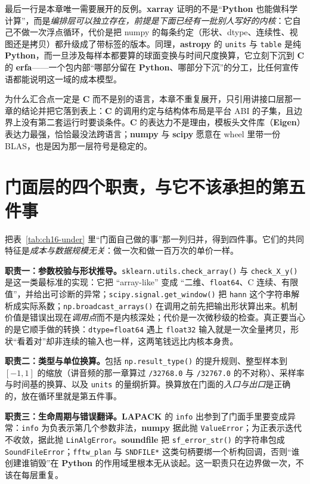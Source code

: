\documentclass[12pt,a4paper,fontset=fandol]{ctexbook}
\newcommand{\Fn}[1]{\texttt{#1()}}
\newcommand{\Tp}[1]{\texttt{#1}}
\newcommand{\Lib}[1]{\textbf{#1}}
\newcommand{\Lang}[1]{\textsf{\bfseries #1}}
\newcommand{\CL}{\Lang{C}}
\newcommand{\PY}{\Lang{Python}}
\begin{document}
最后一行是本章唯一需要展开的反例。\Lib{xarray} 证明的不是``\PY{} 也能做科学计算''，而是\emph{编排层可以独立存在，前提是下面已经有一批别人写好的内核}：它自己不做一次浮点循环，代价是把 numpy 的每条约定（形状、dtype、连续性、视图还是拷贝）都升级成了带标签的版本。同理，\Lib{astropy} 的 \Tp{units} 与 \Tp{table} 是纯 \PY{}，而一旦涉及每样本都要算的球面变换与时间尺度换算，它立刻下沉到 \CL{} 的 \Lib{erfa}——一个包内部``哪部分留在 \PY{}、哪部分下沉''的分工，比任何宣传语都能说明这一域的成本模型。

为什么汇合点一定是 \CL{} 而不是别的语言，本章不重复展开，只引用讲接口层那一章的结论并把它落到表上：\CL{} 的调用约定与结构体布局是平台 ABI 的子集，且边界上没有第二套运行时要谈条件。\CL{} 的表达力不是理由，模板头文件库（\Lib{Eigen}）表达力最强，恰恰最没法跨语言；\Lib{numpy} 与 \Lib{scipy} 愿意在 wheel 里带一份 BLAS，也是因为那一层符号是稳定的。

\section{门面层的四个职责，与它不该承担的第五件事}

把表~\ref{tab:ch16-under} 里``门面自己做的事''那一列归并，得到四件事。它们的共同特征是\emph{成本与数据规模无关}：做一次和做一百万次的单价一样。

\textbf{职责一：参数校验与形状推导。}\Fn{sklearn.utils.check\_array} 与 \Fn{check\_X\_y} 是这一类最标准的实现：它把 ``array-like'' 变成 ``二维、\Tp{float64}、C 连续、有限值''，并给出可诊断的异常；\Fn{scipy.signal.get\_window} 把 \Tp{hann} 这个字符串解析成实际系数；\Fn{np.broadcast\_arrays} 在调用之前先把输出形状算出来。机制价值是错误出现在\emph{调用点}而不是内核深处；代价是一次微秒级的检查。真正要当心的是它顺手做的转换：\Tp{dtype=float64} 遇上 \Tp{float32} 输入就是一次全量拷贝，形状``看着对''却非连续的输入也一样，这两笔钱远比内核本身贵。

\textbf{职责二：类型与单位换算。}包括 \Fn{np.result\_type} 的提升规则、整型样本到 $[-1,1]$ 的缩放（讲音频的那一章算过 \Tp{/32768.0} 与 \Tp{/32767.0} 的不对称）、采样率与时间基的换算、以及 \Tp{units} 的量纲折算。换算放在门面的\emph{入口与出口}是正确的，放在循环里就是第五件事。

\textbf{职责三：生命周期与错误翻译。}\Lib{LAPACK} 的 \Tp{info} 出参到了门面手里要变成异常：\Tp{info} 为负表示第几个参数非法，\Lib{numpy} 据此抛 \Tp{ValueError}；为正表示迭代不收敛，据此抛 \Tp{LinAlgError}。\Lib{soundfile} 把 \Fn{sf\_error\_str} 的字符串包成 \Tp{SoundFileError}；\Tp{fftw\_plan} 与 \Tp{SNDFILE*} 这类句柄要绑一个析构回调，否则``谁创建谁销毁''在 \PY{} 的作用域里根本无从谈起。这一职责只在边界做一次，不该在每层重复。
\end{document}
